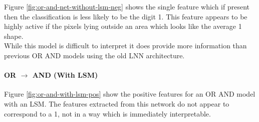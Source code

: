 \begin{minipage}[t]{0.5\textwidth}
	\vspace{0cm}
Figure \ref{fig:or-and-net-without-lsm-neg} shows the single feature which if present then the classification is less likely to be the digit 1. This feature appears to be highly active if the pixels lying outside an area which looks like the average 1 shape.\\

While this model is difficult to interpret it does provide more information than previous OR AND models using the old LNN architecture.
		
\paragraph{OR $\rightarrow$ AND (With LSM)} Figure \ref{fig:or-and-with-lsm-pos} show the positive features for an OR AND model with an LSM. 
The features extracted from this network do not appear to correspond to a 1, not in a way which is immediately interpretable. 
\end{minipage}
\hspace{0.1\textwidth}
